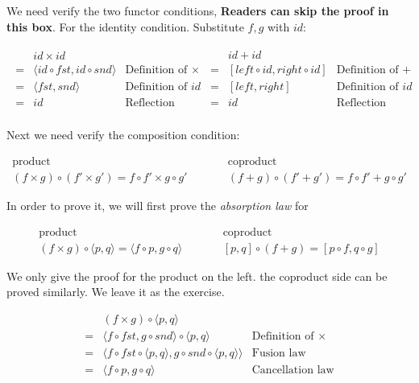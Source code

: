 \documentclass{article}
\begin{document}
\begin{mdframed}
We need verify the two functor conditions, \textbf{Readers can skip the proof in this box}. For the identity condition. Substitute $f, g$ with $id$:

\[
\begin{array}{lr}
  \begin{array}{cll}
    & id \times id & \\
  = & \langle id \circ fst, id \circ snd \rangle & \text{Definition of $\times$} \\
  = & \langle fst, snd \rangle & \text{Definition of $id$} \\
  = & id & \text{Reflection law} \\
  \end{array}
  &
  \begin{array}{cll}
    & id + id & \\
  = & [ left \circ id, right \circ id ] & \text{Definition of $+$} \\
  = & [ left, right] & \text{Definition of $id$} \\
  = & id & \text{Reflection law} \\
  \end{array}
\end{array}
\]

Next we need verify the composition condition:

\[
\begin{array}{ccc}
\text{product} & \quad \quad & \text{coproduct} \\
 (f \times g) \circ (f' \times g') = f \circ f' \times g \circ g'
 & \quad \quad &
 (f + g) \circ (f' + g') = f \circ f' + g \circ g'
\end{array}
\]

In order to prove it, we will first prove the {\em absorption law} for

\[
\begin{array}{ccc}
  \text{product} & \quad \quad & \text{coproduct} \\
  (f \times g) \circ \langle p, q \rangle = \langle f \circ p, g \circ q \rangle
  & \quad \quad &
  [p, q] \circ (f + g) = [p \circ f, q \circ g]
\end{array}
\]

We only give the proof for the product on the left. the coproduct side can be proved similarly. We leave it as the exercise.

\[
\begin{array}{cll}
   & (f \times g) \circ \langle p, q \rangle & \\
 = & \langle f \circ fst, g \circ snd \rangle \circ \langle p, q \rangle & \text{Definition of $\times$} \\
 = & \langle f \circ fst \circ \langle p, q \rangle, g \circ snd \circ \langle p, q \rangle \rangle & \text{Fusion law} \\
 = & \langle f \circ p, g \circ q \rangle & \text{Cancellation law} \\
\end{array}
\]


\end{mdframed}
\end{document}
